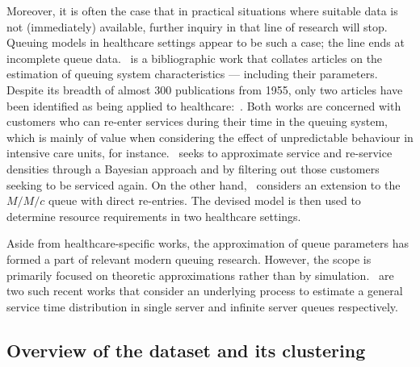 \documentclass[11pt]{article}
\begin{document}
Moreover, it is often the case that in practical situations where suitable data
is not (immediately) available, further inquiry in that line of research will
stop. Queuing models in healthcare settings appear to be such a case; the line
ends at incomplete queue data.~\cite{Asanjarani2017} is a bibliographic work
that collates articles on the estimation of queuing system characteristics ---
including their parameters. Despite its breadth of almost 300 publications from
1955, only two articles have been identified as being applied to
healthcare:~\cite{Mohammadi2012,Yom2014}. Both works are concerned with
customers who can re-enter services during their time in the queuing system,
which is mainly of value when considering the effect of unpredictable behaviour
in intensive care units, for instance.~\cite{Mohammadi2012} seeks to approximate
service and re-service densities through a Bayesian approach and by filtering
out those customers seeking to be serviced again. On the other
hand,~\cite{Yom2014} considers an extension to the \(M/M/c\) queue with direct
re-entries. The devised model is then used to determine resource requirements in
two healthcare settings.

Aside from healthcare-specific works, the approximation of queue parameters has
formed a part of relevant modern queuing research. However, the scope is
primarily focused on theoretic approximations rather than by
simulation.~\cite{Djabali2018,Goldenshluger2016} are two such recent works that
consider an underlying process to estimate a general service time distribution
in single server and infinite server queues respectively.

\subsection{Overview of the dataset and its clustering}\label{subsec:overview}
\end{document}
